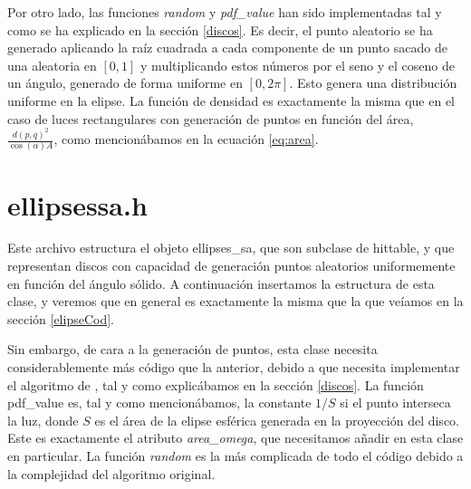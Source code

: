 \documentclass{scrbook}
\begin{document}
Por otro lado, las funciones \textit{random} y \textit{pdf\_value} han sido implementadas tal y como se ha explicado en la sección \ref{discos}. Es decir, el punto aleatorio se ha generado aplicando la raíz cuadrada a cada componente de un punto sacado de una aleatoria en $[0,1]$ y multiplicando estos números por el seno y el coseno de un ángulo, generado de forma uniforme en $[0, 2\pi]$. Esto genera una distribución uniforme en la elipse. La función de densidad es exactamente la misma que en el caso de luces rectangulares con generación de puntos en función del área, $\frac{d(p,q)^2}{\cos(\alpha)A}$, como mencionábamos en la ecuación \eqref{eq:area}.

\section{ellipsessa.h}
\label{elipsesa}
Este archivo estructura el objeto ellipses\_sa, que son subclase de hittable, y que representan discos con capacidad de generación puntos aleatorios uniformemente en función del ángulo sólido. A continuación insertamos la estructura de esta clase, y veremos que en general es exactamente la misma que la que veíamos en la sección \ref{elipseCod}.

Sin embargo, de cara a la generación de puntos, esta clase necesita considerablemente más código que la anterior, debido a que necesita implementar el algoritmo de \cite{ur2017}, tal y como explicábamos en la sección \ref{discos}. La función pdf\_value es, tal y como mencionábamos, la constante $1/S$ si el punto interseca la luz, donde $S$ es el área de la elipse esférica generada en la proyección del disco. Este es exactamente el atributo \textit{area\_omega}, que necesitamos añadir en esta clase en particular. La función \textit{random} es la más complicada de todo el código debido a la complejidad del algoritmo original.
\end{document}
